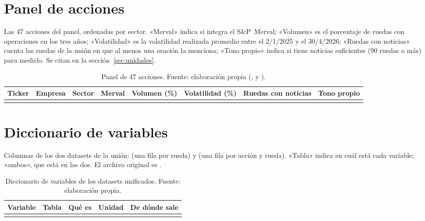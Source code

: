\appendix
\addto\captionsspanish{\renewcommand{\appendixname}{Anexo}}
\renewcommand{\appendixname}{Anexo}

\chapter{Panel de acciones}
\label{anx:panel}

Las 47 acciones del panel, ordenadas por sector. «Merval» indica si integra el S\&P~Merval;
«Volumen» es el porcentaje de ruedas con operaciones en los tres años; «Volatilidad» es la
volatilidad realizada promedio entre el 2/1/2025 y el 30/4/2026; «Ruedas con noticias» cuenta
las ruedas de la unión en que al menos una oración la menciona; «Tono propio» indica si tiene
noticias suficientes (90 ruedas o más) para medirlo. Se citan en la sección~\ref{sec:unidades}.

{\footnotesize\setlength{\tabcolsep}{3.5pt}
\begin{longtable}{@{}lL{3.2cm}L{2.35cm}C{1.1cm}C{1.3cm}C{1.75cm}C{1.4cm}C{1.1cm}@{}}
\toprule
\textbf{Ticker} & \textbf{Empresa} & \textbf{Sector} & \textbf{Merval} & \textbf{Volumen (\%)} & \textbf{Volatilidad (\%)} & \textbf{Ruedas con noticias} & \textbf{Tono propio} \\
\midrule
\endhead
\bottomrule
\caption{Panel de 47 acciones. Fuente: elaboración propia
(,  y
).}
\label{tab:panel}
\endlastfoot

\end{longtable}
}

\chapter{Diccionario de variables}
\label{anx:diccionario}

Columnas de los dos datasets de la unión:  (una fila por rueda) y
 (una fila por acción y rueda). «Tabla» indica en cuál está cada
variable; «ambos», que está en las dos. El archivo original es
.

{\footnotesize\setlength{\tabcolsep}{3.5pt}
\begin{longtable}{@{}L{3.0cm}L{1.2cm}L{5.1cm}L{1.9cm}L{3.0cm}@{}}
\toprule
\textbf{Variable} & \textbf{Tabla} & \textbf{Qué es} & \textbf{Unidad} & \textbf{De dónde sale} \\
\midrule
\endhead
\bottomrule
\caption{Diccionario de variables de los datasets unificados. Fuente: elaboración propia.}
\label{tab:diccionario}
\endlastfoot

\end{longtable}
}


